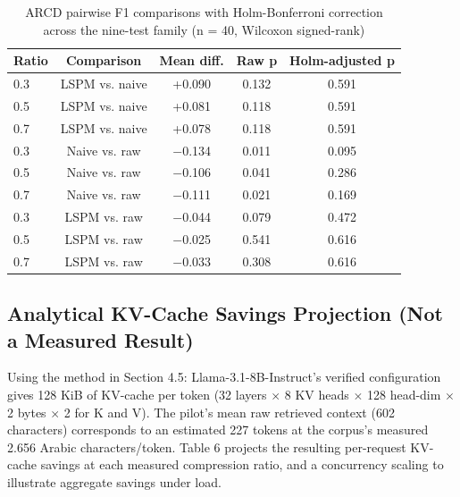 \documentclass[pdflatex,sn-basic,Numbered]{sn-jnl}
\begin{document}
\begin{table}[htbp]
\caption{ARCD pairwise F1 comparisons with Holm-Bonferroni correction across the nine-test family (n = 40, Wilcoxon signed-rank)}
\label{tab:5}
\centering
\footnotesize
\setlength{\tabcolsep}{3.5pt}
\begin{tabular}{lcccc}
\toprule
Ratio & Comparison & Mean diff. & Raw p & Holm-adjusted p \\
\midrule
0.3 & LSPM vs. naive & +0.090 & 0.132 & 0.591 \\
0.5 & LSPM vs. naive & +0.081 & 0.118 & 0.591 \\
0.7 & LSPM vs. naive & +0.078 & 0.118 & 0.591 \\
0.3 & Naive vs. raw & $-$0.134 & 0.011 & 0.095 \\
0.5 & Naive vs. raw & $-$0.106 & 0.041 & 0.286 \\
0.7 & Naive vs. raw & $-$0.111 & 0.021 & 0.169 \\
0.3 & LSPM vs. raw & $-$0.044 & 0.079 & 0.472 \\
0.5 & LSPM vs. raw & $-$0.025 & 0.541 & 0.616 \\
0.7 & LSPM vs. raw & $-$0.033 & 0.308 & 0.616 \\
\bottomrule
\end{tabular}
\end{table}
\subsection{Analytical KV-Cache Savings Projection (Not a Measured Result)}
Using the method in Section 4.5: Llama-3.1-8B-Instruct's verified configuration gives 128 KiB of KV-cache per token (32 layers $\times$ 8 KV heads $\times$ 128 head-dim $\times$ 2 bytes $\times$ 2 for K and V). The pilot's mean raw retrieved context (602 characters) corresponds to an estimated 227 tokens at the corpus's measured 2.656 Arabic characters/token. Table 6 projects the resulting per-request KV-cache savings at each measured compression ratio, and a concurrency scaling to illustrate aggregate savings under load.
\end{document}
